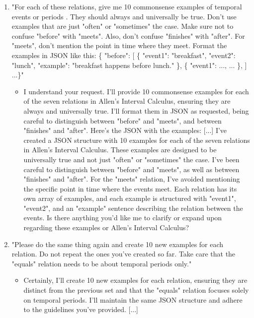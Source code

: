 \documentclass[11pt]{article}
\begin{document}
\begin{enumerate}
\begin{itemize}
        Would you like me to provide visual representations or examples of these relations?
    \end{itemize}
  \item "For each of these relations, give me 10 commonsense examples of temporal events or periods . They should always and universally be true. Don't use examples that are just "often" or "sometimes" the case. Make sure not to confuse "before" with "meets". Also, don't confuse "finishes" with "after". For "meets", don't mention the point in time where they meet. Format the examples in JSON like this:
    \{ "before": [ \{ "event1": "breakfast", "event2": "lunch", "example": "breakfast happens before lunch." \}, \{ "event1": ..., ... \}, ] ...\}"
    \begin{itemize}
      \item I understand your request. I'll provide 10 commonsense examples for each of the seven relations in Allen's Interval Calculus, ensuring they are always and universally true. I'll format them in JSON as requested, being careful to distinguish between "before" and "meets", and between "finishes" and "after". Here's the JSON with the examples:
        [...]
  I've created a JSON structure with 10 examples for each of the seven relations in Allen's Interval Calculus. These examples are designed to be universally true and not just "often" or "sometimes" the case. I've been careful to distinguish between "before" and "meets", as well as between "finishes" and "after". For the "meets" relation, I've avoided mentioning the specific point in time where the events meet.
  Each relation has its own array of examples, and each example is structured with "event1", "event2", and an "example" sentence describing the relation between the events.
  Is there anything you'd like me to clarify or expand upon regarding these examples or Allen's Interval Calculus?
    \end{itemize}
  \item "Please do the same thing again and create 10 new examples for each relation. Do not repeat the ones you've created so far. Take care that the "equals" relation needs to be about temporal periods only."
    \begin{itemize}
      \item Certainly, I'll create 10 new examples for each relation, ensuring they are distinct from the previous set and that the "equals" relation focuses solely on temporal periods. I'll maintain the same JSON structure and adhere to the guidelines you've provided.
        [...]

\end{itemize}
\end{enumerate}
\end{document}
